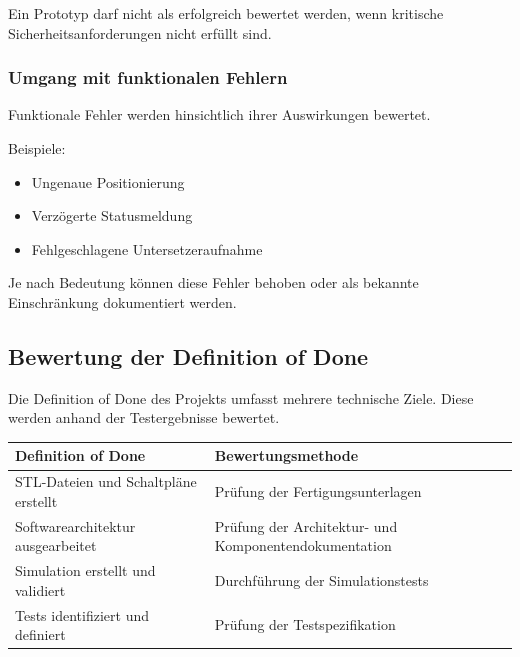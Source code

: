 \documentclass[
  a4paper,
  12pt,
  DIV=12,        %
  parskip=half,  %
  headings=small %
]{scrartcl}
\theoremstyle{definition}
\providecommand{\tightlist}{%
  \setlength{\itemsep}{0pt}\setlength{\parskip}{0pt}}
\theoremstyle{definition}
\begin{document}
Ein Prototyp darf nicht als erfolgreich bewertet werden, wenn kritische
Sicherheitsanforderungen nicht erfüllt sind.

\subsubsection{Umgang mit funktionalen
Fehlern}\label{umgang-mit-funktionalen-fehlern}

Funktionale Fehler werden hinsichtlich ihrer Auswirkungen bewertet.

Beispiele:

\begin{itemize}
\tightlist
\item
  Ungenaue Positionierung
\item
  Verzögerte Statusmeldung
\item
  Fehlgeschlagene Untersetzeraufnahme
\end{itemize}

Je nach Bedeutung können diese Fehler behoben oder als bekannte
Einschränkung dokumentiert werden.

\subsection{Bewertung der Definition of
Done}\label{bewertung-der-definition-of-done}

Die Definition of Done des Projekts umfasst mehrere technische Ziele.
Diese werden anhand der Testergebnisse bewertet.

\begin{longtable}[]{@{}
  >{\raggedright\arraybackslash}p{}
  >{\raggedright\arraybackslash}p{}@{}}
\toprule\noalign{}
\begin{minipage}[b]{\linewidth}\raggedright
Definition of Done
\end{minipage} & \begin{minipage}[b]{\linewidth}\raggedright
Bewertungsmethode
\end{minipage} \\
\midrule\noalign{}
\endhead
\bottomrule\noalign{}
\endlastfoot
STL-Dateien und Schaltpläne erstellt & Prüfung der
Fertigungsunterlagen \\
Softwarearchitektur ausgearbeitet & Prüfung der Architektur- und
Komponentendokumentation \\
Simulation erstellt und validiert & Durchführung der Simulationstests \\
Tests identifiziert und definiert & Prüfung der Testspezifikation \\
\end{longtable}
\end{document}
